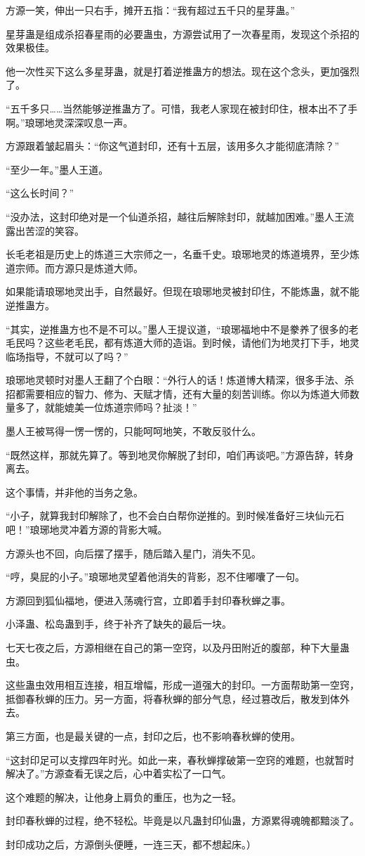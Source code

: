 \begin{this_body}
方源一笑，伸出一只右手，摊开五指：“我有超过五千只的星芽蛊。”

星芽蛊是组成杀招春星雨的必要蛊虫，方源尝试用了一次春星雨，发现这个杀招的效果极佳。

他一次性买下这么多星芽蛊，就是打着逆推蛊方的想法。现在这个念头，更加强烈了。

“五千多只……当然能够逆推蛊方了。可惜，我老人家现在被封印住，根本出不了手啊。”琅琊地灵深深叹息一声。

方源跟着皱起眉头：“你这气道封印，还有十五层，该用多久才能彻底清除？”

“至少一年。”墨人王道。

“这么长时间？”

“没办法，这封印绝对是一个仙道杀招，越往后解除封印，就越加困难。”墨人王流露出苦涩的笑容。

长毛老祖是历史上的炼道三大宗师之一，名垂千史。琅琊地灵的炼道境界，至少炼道宗师。而方源只是炼道大师。

如果能请琅琊地灵出手，自然最好。但现在琅琊地灵被封印住，不能炼蛊，就不能逆推蛊方。

“其实，逆推蛊方也不是不可以。”墨人王提议道，“琅琊福地中不是豢养了很多的老毛民吗？这些老毛民，都有炼道大师的造诣。到时候，请他们为地灵打下手，地灵临场指导，不就可以了吗？”

琅琊地灵顿时对墨人王翻了个白眼：“外行人的话！炼道博大精深，很多手法、杀招都需要相应的智力、修为、天赋才情，还有大量的刻苦训练。你以为炼道大师数量多了，就能媲美一位炼道宗师吗？扯淡！”

墨人王被骂得一愣一愣的，只能呵呵地笑，不敢反驳什么。

“既然这样，那就先算了。等到地灵你解脱了封印，咱们再谈吧。”方源告辞，转身离去。

这个事情，并非他的当务之急。

“小子，就算我封印解除了，也不会白白帮你逆推的。到时候准备好三块仙元石吧！”琅琊地灵冲着方源的背影大喊。

方源头也不回，向后摆了摆手，随后踏入星门，消失不见。

“哼，臭屁的小子。”琅琊地灵望着他消失的背影，忍不住嘟囔了一句。

方源回到狐仙福地，便进入荡魂行宫，立即着手封印春秋蝉之事。

小泽蛊、松岛蛊到手，终于补齐了缺失的最后一块。

七天七夜之后，方源相继在自己的第一空窍，以及丹田附近的腹部，种下大量蛊虫。

这些蛊虫效用相互连接，相互增幅，形成一道强大的封印。一方面帮助第一空窍，抵御春秋蝉的压力。另一方面，将春秋蝉的部分气息，经过篡改后，散发到体外去。

第三方面，也是最关键的一点，封印之后，也不影响春秋蝉的使用。

“这封印足可以支撑四年时光。如此一来，春秋蝉撑破第一空窍的难题，也就暂时解决了。”方源查看无误之后，心中着实松了一口气。

这个难题的解决，让他身上肩负的重压，也为之一轻。

封印春秋蝉的过程，绝不轻松。毕竟是以凡蛊封印仙蛊，方源累得魂魄都黯淡了。

封印成功之后，方源倒头便睡，一连三天，都不想起床。）

\end{this_body}

